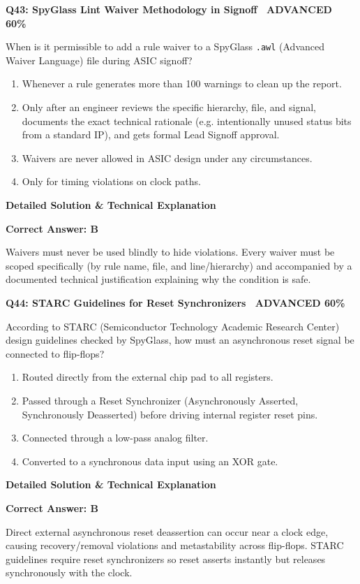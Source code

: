 \documentclass[11pt,a4paper]{article}
\newcommand{\badgeadv}{{\color{white}\colorbox{advred}{\bfseries\sffamily\tiny\ ADVANCED 60\%\ }}}
\newenvironment{qbox}[2]{%
  \begin{mdframed}[style=qstyle]%
  {\bfseries\sffamily\color{primaryblue}#1 \hfill #2}\par\vspace{2pt}%
}{%
  \end{mdframed}%
}
\newenvironment{ansbox}{%
  \begin{mdframed}[style=ansstyle]%
  {\bfseries\sffamily\color{ansgreen}\small Detailed Solution \& Technical Explanation}\par\vspace{2pt}\small%
}{%
  \end{mdframed}%
}
\begin{document}
\begin{qbox}{Q43: SpyGlass Lint Waiver Methodology in Signoff}{\badgeadv}
When is it permissible to add a rule waiver to a SpyGlass \texttt{.awl} (Advanced Waiver Language) file during ASIC signoff?
\begin{enumerate}[label=\textbf{\Alph*.}]
  \item Whenever a rule generates more than 100 warnings to clean up the report.
  \item Only after an engineer reviews the specific hierarchy, file, and signal, documents the exact technical rationale (e.g. intentionally unused status bits from a standard IP), and gets formal Lead Signoff approval.
  \item Waivers are never allowed in ASIC design under any circumstances.
  \item Only for timing violations on clock paths.
\end{enumerate}
\end{qbox}
\begin{ansbox}
\textbf{Correct Answer: B}

Waivers must never be used blindly to hide violations. Every waiver must be scoped specifically (by rule name, file, and line/hierarchy) and accompanied by a documented technical justification explaining why the condition is safe.
\end{ansbox}

\begin{qbox}{Q44: STARC Guidelines for Reset Synchronizers}{\badgeadv}
According to STARC (Semiconductor Technology Academic Research Center) design guidelines checked by SpyGlass, how must an asynchronous reset signal be connected to flip-flops?
\begin{enumerate}[label=\textbf{\Alph*.}]
  \item Routed directly from the external chip pad to all registers.
  \item Passed through a Reset Synchronizer (Asynchronously Asserted, Synchronously Deasserted) before driving internal register reset pins.
  \item Connected through a low-pass analog filter.
  \item Converted to a synchronous data input using an XOR gate.
\end{enumerate}
\end{qbox}
\begin{ansbox}
\textbf{Correct Answer: B}

Direct external asynchronous reset deassertion can occur near a clock edge, causing recovery/removal violations and metastability across flip-flops. STARC guidelines require reset synchronizers so reset asserts instantly but releases synchronously with the clock.
\end{ansbox}
\end{document}
